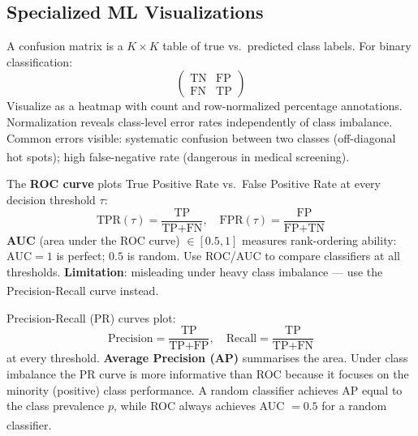 \subsection{Specialized ML Visualizations}

\begin{tcbitemize}[ skin=sectionraster ]
    \tcbitem[title={Confusion Matrix}, raster multicolumn=3]
    A confusion matrix is a $K \times K$ table of true vs.\ predicted class labels.
    For binary classification:
    \begin{equation}
        \begin{pmatrix} \text{TN} & \text{FP} \\ \text{FN} & \text{TP} \end{pmatrix}
    \end{equation}
    Visualize as a heatmap with count and row-normalized percentage annotations.
    Normalization reveals class-level error rates independently of class imbalance.
    Common errors visible: systematic confusion between two classes (off-diagonal hot
    spots); high false-negative rate (dangerous in medical
    screening)\textsuperscript{\cite[][pp.~180--185]{raschkaPythonMachineLearning2015}}.

    \tcbitem[title={ROC Curve and AUC}, raster multicolumn=3]
    The \textbf{ROC curve} plots True Positive Rate vs.\ False Positive Rate at every
    decision threshold $\tau$:
    \begin{equation}
        \text{TPR}(\tau) = \frac{\text{TP}}{\text{TP}+\text{FN}}, \quad
        \text{FPR}(\tau) = \frac{\text{FP}}{\text{FP}+\text{TN}}
    \end{equation}
    \textbf{AUC} (area under the ROC curve) $\in [0.5, 1]$ measures rank-ordering
    ability: $\text{AUC}=1$ is perfect; $0.5$ is random.
    Use ROC/AUC to compare classifiers at all thresholds.
    \textbf{Limitation}: misleading under heavy class imbalance --- use the
    Precision-Recall curve
    instead\textsuperscript{\cite[][pp.~185--190]{raschkaPythonMachineLearning2015}}.

    \tcbitem[title={Precision-Recall Curve}, raster multicolumn=3]
    Precision-Recall (PR) curves plot:
    \begin{equation}
        \text{Precision} = \frac{\text{TP}}{\text{TP}+\text{FP}}, \quad
        \text{Recall} = \frac{\text{TP}}{\text{TP}+\text{FN}}
    \end{equation}
    at every threshold. \textbf{Average Precision (AP)} summarises the area.
    Under class imbalance the PR curve is more informative than ROC because it
    focuses on the minority (positive) class performance. A random classifier achieves
    AP equal to the class prevalence $p$, while ROC always achieves AUC $= 0.5$
    for a random
    classifier\textsuperscript{\cite[][pp.~190--195]{raschkaPythonMachineLearning2015}}.


\end{tcbitemize}
